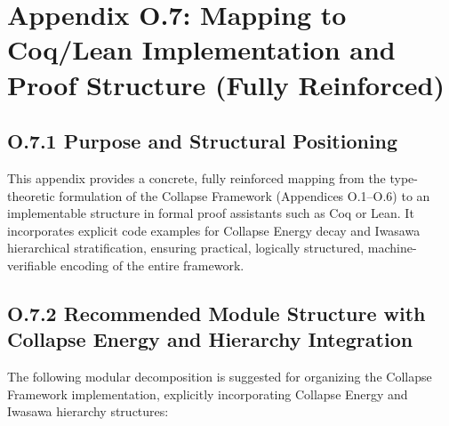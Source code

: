 \documentclass[11pt]{article}
\begin{document}
\section*{Appendix O.7: Mapping to Coq/Lean Implementation and Proof Structure (Fully Reinforced)}

\subsection*{O.7.1 Purpose and Structural Positioning}

This appendix provides a concrete, fully reinforced mapping from the type-theoretic formulation of the Collapse Framework (Appendices O.1–O.6) to an implementable structure in formal proof assistants such as Coq or Lean.  
It incorporates explicit code examples for Collapse Energy decay and Iwasawa hierarchical stratification, ensuring practical, logically structured, machine-verifiable encoding of the entire framework.

\subsection*{O.7.2 Recommended Module Structure with Collapse Energy and Hierarchy Integration}

The following modular decomposition is suggested for organizing the Collapse Framework implementation, explicitly incorporating Collapse Energy and Iwasawa hierarchy structures:
\end{document}
